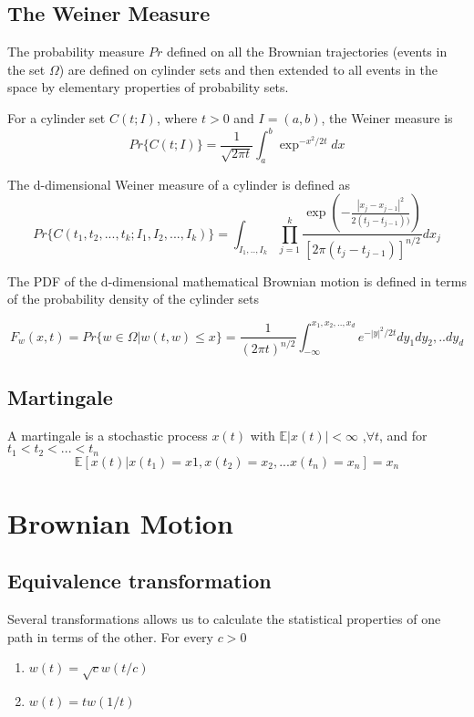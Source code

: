 \documentclass[12pt]{book}
\begin{document}
\section{The Weiner Measure}\label{section:theWeinerMeasure}
The probability measure $Pr$ defined on all the Brownian trajectories (events in the set $\Omega$) are defined on cylinder sets and then extended to all events in the space by elementary properties of probability sets.

For a cylinder set $C(t;I)$, where $t>0$ and $I=(a,b)$, the Weiner measure is 
\begin{equation*}
Pr\{C(t;I)\}=\frac{1}{\sqrt{2\pi t}}\int_a^b\exp^{-x^2/2t}dx
\end{equation*}

The d-dimensional Weiner measure of a cylinder is defined as 
\begin{equation*}
Pr\{C(t_1,t_2,...,t_k;I_1,I_2,...,I_k)\} = \int_{I_1,..,I_k}\prod_{j=1}^k\frac{\exp\left(-\frac{|x_j-x_{j-1}|^2} {2(t_j-t_{j-1}))}\right)}{[2\pi(t_j-t_{j-1})]^{n/2}}dx_j
\end{equation*}

The PDF of the d-dimensional mathematical Brownian motion is defined in terms of the probability density of the cylinder sets

\begin{equation*}
F_w(x,t)=Pr\{w\in \Omega |w(t,w)\leq x\}=\frac{1}{(2\pi t)^{n/2}}\int_{-\infty}^{x_1,x_2,..,x_d}e^{-|y|^2 /2t}dy_1dy_2,..dy_d
\end{equation*}

\section{Martingale}\label{section:martingale}
A martingale is a stochastic process $ x(t)$ with $\mathbb{E}|x(t)|<\infty$ ,$\forall t$, and for $t_1<t_2<...<t_n$
\begin{equation*}
\mathbb{E}[x(t)|x(t_1)=x1,x(t_2)=x_2,...x(t_n)=x_n]=x_n
\end{equation*}
\chapter{Brownian Motion}
\section{Equivalence transformation}
Several transformations allows us to calculate the statistical properties of one path in terms of the other. For every $c>0$ 
\begin{enumerate}
\item $w(t) = \sqrt{c}w(t/c)$
\item $w(t) = tw(1/t)$
\end{enumerate}
\end{document}
